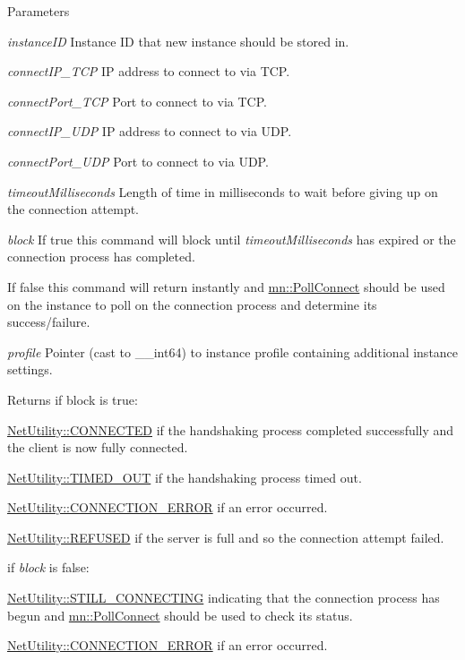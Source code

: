 \begin{DoxyParams}{Parameters}
\item[{\em instanceID}]Instance ID that new instance should be stored in. \item[{\em connectIP\_\-TCP}]IP address to connect to via TCP. \item[{\em connectPort\_\-TCP}]Port to connect to via TCP. \item[{\em connectIP\_\-UDP}]IP address to connect to via UDP. \item[{\em connectPort\_\-UDP}]Port to connect to via UDP. \item[{\em timeoutMilliseconds}]Length of time in milliseconds to wait before giving up on the connection attempt. \item[{\em block}]If true this command will block until {\itshape timeoutMilliseconds\/} has expired or the connection process has completed. \par
 If false this command will return instantly and \hyperlink{namespacemn_a3f6e329576ac7a8c036f2040bd6314a3}{mn::PollConnect} should be used on the instance to poll on the connection process and determine its success/failure. \item[{\em profile}]Pointer (cast to \_\-\_\-int64) to instance profile containing additional instance settings.\end{DoxyParams}
\begin{DoxyReturn}{Returns}
if block is true: \par
 

\hyperlink{class_net_utility_a7eae52138f8bd597ffc67ebf07e86b6da9c07ac24fb9bdd4157ace978968721fd}{NetUtility::CONNECTED} if the handshaking process completed successfully and the client is now fully connected. 

\hyperlink{class_net_utility_a7eae52138f8bd597ffc67ebf07e86b6da319e02f6059b4b08edd70c16fa5206fd}{NetUtility::TIMED\_\-OUT} if the handshaking process timed out. 

\hyperlink{class_net_utility_a7eae52138f8bd597ffc67ebf07e86b6da7c6b34544a99c4c264366f2fed4f0973}{NetUtility::CONNECTION\_\-ERROR} if an error occurred. 

\hyperlink{class_net_utility_a7eae52138f8bd597ffc67ebf07e86b6dabc894c2de7a4404e353f3bcc1193e90b}{NetUtility::REFUSED} if the server is full and so the connection attempt failed.\par
\par


if {\itshape block\/} is false:\par
 

\hyperlink{class_net_utility_a7eae52138f8bd597ffc67ebf07e86b6da86caa623f8ffc60da40df3c2ab17532c}{NetUtility::STILL\_\-CONNECTING} indicating that the connection process has begun and \hyperlink{namespacemn_a3f6e329576ac7a8c036f2040bd6314a3}{mn::PollConnect} should be used to check its status. 

\hyperlink{class_net_utility_a7eae52138f8bd597ffc67ebf07e86b6da7c6b34544a99c4c264366f2fed4f0973}{NetUtility::CONNECTION\_\-ERROR} if an error occurred. 
\end{DoxyReturn}
